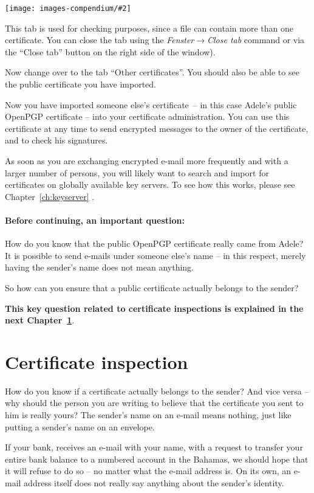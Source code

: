 \documentclass[a4paper,11pt,oneside,openright,titlepage]{scrbook}
\newcommand{\Menu}[1]{\textit{#1}}
\newcommand{\Email}{e-mail}
\newcommand{\IncludeImage}[2][]{
\begin{center}
  \texttt{[image: images-compendium/\#2]}%
\end{center}
}
\begin{document}
\IncludeImage[width=0.85\textwidth]{sc-kleopatra-withAdeleKey_en}

This tab is used for checking purposes, since a file can contain more
than one certificate. You can close the tab using the
\Menu{Fenster$\rightarrow$Close tab} command or via the
``Close tab'' button on the right side of the window).

Now change over to the tab ``Other certificates''. You should also be
able to see the public certificate you have imported.

Now you have imported someone else's certificate~-- in this case
Adele's public OpenPGP certificate -- into your certificate
administration. You can use this certificate at any time to send
encrypted messages to the owner of the certificate, and to check his
signatures.

As soon as you are exchanging encrypted \Email{} more
frequently and with a larger number of persons, you will likely want
to search and import for certificates on globally available key
servers. To see how this works, please see Chapter~\ref{ch:keyserver}
.\\

\subsubsection{Before continuing, an important question:}
How do you know that the public OpenPGP certificate really came from
Adele? It is possible to send \Email{}s under someone else's
name -- in this respect, merely having the sender's name does not mean
anything.

So how can you ensure that a public certificate actually
belongs to the sender?

\textbf{This key question related to certificate inspections is
explained in the next Chapter~\ref{ch:trust}}.

\clearpage
\chapter{Certificate inspection}
\label{ch:trust}

How do you know if a certificate actually belongs to the sender? And
vice versa -- why should the person you are writing to believe that
the certificate you sent to him is really yours? The sender's name on
an \Email{} means nothing, just like putting a sender's name on
an envelope.

If your bank, receives an \Email{} with your name,
with a request to transfer your entire bank balance to a numbered
account in the Bahamas, we should hope that it will refuse to do so --
no matter what the \Email{} address is. On its own, an \Email{} address
itself does not really say anything about the sender's identity.
\end{document}
